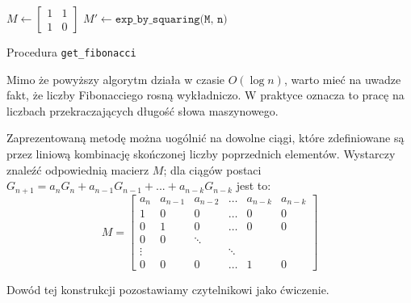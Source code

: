 \begin{algorithm}[h]
	\DontPrintSemicolon
	
	

	$M \leftarrow \begin{bmatrix}1 & 1\\1 & 0\end{bmatrix}$\;
	$M' \leftarrow \texttt{exp\_by\_squaring(M, n)}$\;
	
	\;

	\caption{Procedura \texttt{get\_fibonacci}}
\end{algorithm}

Mimo że powyższy algorytm działa w czasie $O(\log{n})$, warto mieć na uwadze fakt, że liczby Fibonacciego 
rosną wykładniczo. W praktyce oznacza to pracę na liczbach przekraczających długość słowa maszynowego.

Zaprezentowaną metodę można uogólnić na dowolne ciągi, które zdefiniowane są przez liniową 
kombinację skończonej liczby poprzednich elementów. Wystarczy znaleźć odpowiednią macierz $M$; 
dla ciągów postaci $G_{n + 1} = a_n G_n + a_{n - 1} G_{n - 1} + ... + a_{n - k} G_{n - k}$ jest to:
\begin{equation}
	M = \begin{bmatrix}a_n    & a_{n - 1} & a_{n - 2} & \dots & a_{n - k} & a_{n - k}\\
	                   1      & 0         & 0         & \dots & 0 & 0 \\
	                   0      & 1         & 0         & \dots & 0 & 0\\
	                   0      & 0         & \ddots\\
	                   \vdots &           &           & \ddots\\
	                   0      & 0         & 0         & \dots & 1 & 0
	    \end{bmatrix}
\end{equation}

Dowód tej konstrukcji pozostawiamy czytelnikowi jako ćwiczenie.
